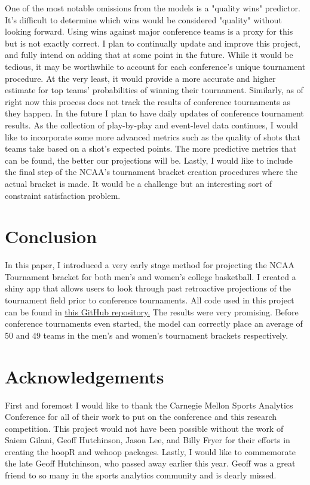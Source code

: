 \documentclass{article}
\begin{document}
One of the most notable omissions from the models is a "quality wins" predictor. It's difficult to determine which wins would be considered "quality" without looking forward. Using wins against major conference teams is a proxy for this but is not exactly correct. I plan to continually update and improve this project, and fully intend on adding that at some point in the future. While it would be tedious, it may be worthwhile to account for each conference's unique tournament procedure. At the very least, it would provide a more accurate and higher estimate for top teams' probabilities of winning their tournament. Similarly, as of right now this process does not track the results of conference tournaments as they happen. In the future I plan to have daily updates of conference tournament results. As the collection of play-by-play and event-level data continues, I would like to incorporate some more advanced metrics such as the quality of shots that teams take based on a shot's expected points. The more predictive metrics that can be found, the better our projections will be. Lastly, I would like to include the final step of the NCAA's tournament bracket creation procedures where the actual bracket is made. It would be a challenge but an interesting sort of constraint satisfaction problem.

\section{Conclusion}

In this paper, I introduced a very early stage method for projecting the NCAA Tournament bracket for both men's and women's college basketball. I created a shiny app that allows users to look through past retroactive projections of the tournament field prior to conference tournaments. All code used in this project can be found in \href{https://github.com/mjegle/Bracketology}{this GitHub repository.} The results were very promising. Before conference tournaments even started, the model can correctly place an average of 50 and 49 teams in the men's and women's tournament brackets respectively.

\section{Acknowledgements}

First and foremost I would like to thank the Carnegie Mellon Sports Analytics Conference for all of their work to put on the conference and this research competition. This project would not have been possible without the work of Saiem Gilani, Geoff Hutchinson, Jason Lee, and Billy Fryer for their efforts in creating the hoopR and wehoop packages. Lastly, I would like to commemorate the late Geoff Hutchinson, who passed away earlier this year. Geoff was a great friend to so many in the sports analytics community and is dearly missed.




\end{document}
